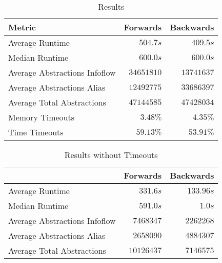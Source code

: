 \documentclass[../draft.tex]{subfiles}
\begin{document}
    
    \begin{table}[ht]
        \centering
        \begin{tabular}{l | r | r}
            \textbf{Metric} & \textbf{Forwards} & \textbf{Backwards}\\
            \hline\hline
            Average Runtime & $504.7s$ & $409.5s$\\
            Median Runtime & $600.0s$ & $600.0s$\\
            \hline
            Average Abstractions Infoflow & $34651810$ & $13741637$\\
            Average Abstractions Alias & $12492775$ & $33686397$\\
            Average Total Abstractions & $47144585$ & $47428034$\\
            \hline
            Memory Timeouts & $3.48\%$ & $4.35\%$\\
            Time Timeouts & $59.13\%$ & $53.91\%$\\                     
        \end{tabular}
        \caption{Results}
        \label{t:realworldresults}
    \end{table}

    \begin{table}[ht]
        \centering
        \begin{tabular}{l | r | r}
            & \textbf{Forwards} & \textbf{Backwards}\\
            \hline\hline
            Average Runtime & $331.6s$ & $133.96s$\\
            Median Runtime & $591.0s$ & $1.0s$\\
            \hline
            Average Abstractions Infoflow & $7468347$ & $2262268$\\
            Average Abstractions Alias & $2658090$ & $4884307$\\
            Average Total Abstractions & $10126437$ & $7146575$\\
            \hline
        \end{tabular}
        \caption{Results without Timeouts}
        \label{t:realworldresultswithouttimeout}
    \end{table}
\end{document}
